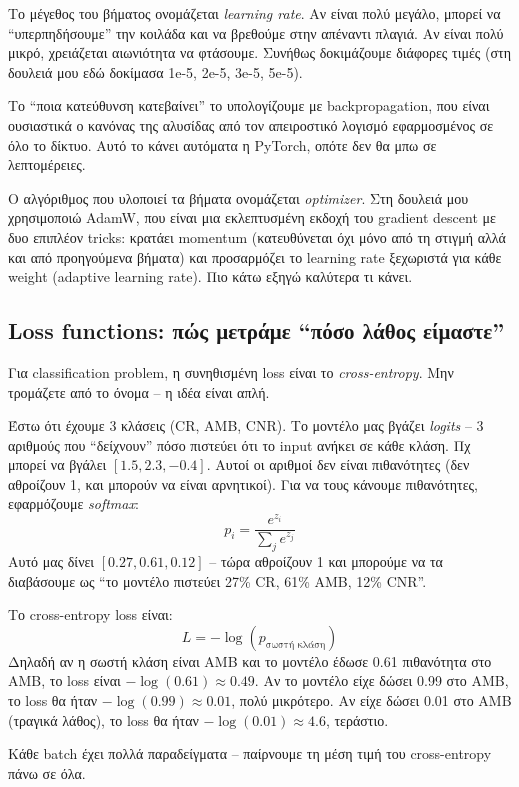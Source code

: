 \documentclass[12pt]{fphw}
\begin{document}
Το μέγεθος του βήματος ονομάζεται \emph{learning rate}. Αν είναι πολύ μεγάλο, μπορεί να ``υπερπηδήσουμε'' την κοιλάδα και να βρεθούμε στην απέναντι πλαγιά. Αν είναι πολύ μικρό, χρειάζεται αιωνιότητα να φτάσουμε. Συνήθως δοκιμάζουμε διάφορες τιμές (στη δουλειά μου εδώ δοκίμασα 1e-5, 2e-5, 3e-5, 5e-5).

Το ``ποια κατεύθυνση κατεβαίνει'' το υπολογίζουμε με backpropagation, που είναι ουσιαστικά ο κανόνας της αλυσίδας από τον απειροστικό λογισμό εφαρμοσμένος σε όλο το δίκτυο. Αυτό το κάνει αυτόματα η PyTorch, οπότε δεν θα μπω σε λεπτομέρειες.

Ο αλγόριθμος που υλοποιεί τα βήματα ονομάζεται \emph{optimizer}. Στη δουλειά μου χρησιμοποιώ AdamW, που είναι μια εκλεπτυσμένη εκδοχή του gradient descent με δυο επιπλέον tricks: κρατάει momentum (κατευθύνεται όχι μόνο από τη στιγμή αλλά και από προηγούμενα βήματα) και προσαρμόζει το learning rate ξεχωριστά για κάθε weight (adaptive learning rate). Πιο κάτω εξηγώ καλύτερα τι κάνει.

\subsection{Loss functions: πώς μετράμε ``πόσο λάθος είμαστε''}

Για classification problem, η συνηθισμένη loss είναι το \emph{cross-entropy}. Μην τρομάζετε από το όνομα -- η ιδέα είναι απλή.

Έστω ότι έχουμε 3 κλάσεις (CR, AMB, CNR). Το μοντέλο μας βγάζει \emph{logits} -- 3 αριθμούς που ``δείχνουν'' πόσο πιστεύει ότι το input ανήκει σε κάθε κλάση. Πχ μπορεί να βγάλει $[1.5, 2.3, -0.4]$. Αυτοί οι αριθμοί δεν είναι πιθανότητες (δεν αθροίζουν 1, και μπορούν να είναι αρνητικοί). Για να τους κάνουμε πιθανότητες, εφαρμόζουμε \emph{softmax}:
\[
p_i = \frac{e^{z_i}}{\sum_j e^{z_j}}
\]
Αυτό μας δίνει $[0.27, 0.61, 0.12]$ -- τώρα αθροίζουν 1 και μπορούμε να τα διαβάσουμε ως ``το μοντέλο πιστεύει 27\% CR, 61\% AMB, 12\% CNR''.

Το cross-entropy loss είναι:
\[
L = -\log(p_{\text{σωστή κλάση}})
\]
Δηλαδή αν η σωστή κλάση είναι AMB και το μοντέλο έδωσε 0.61 πιθανότητα στο AMB, το loss είναι $-\log(0.61) \approx 0.49$. Αν το μοντέλο είχε δώσει 0.99 στο AMB, το loss θα ήταν $-\log(0.99) \approx 0.01$, πολύ μικρότερο. Αν είχε δώσει 0.01 στο AMB (τραγικά λάθος), το loss θα ήταν $-\log(0.01) \approx 4.6$, τεράστιο.

Κάθε batch έχει πολλά παραδείγματα -- παίρνουμε τη μέση τιμή του cross-entropy πάνω σε όλα.
\end{document}
